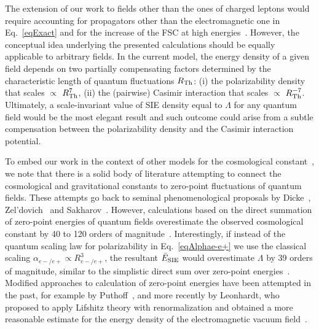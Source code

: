 \documentclass[aps,prl,twocolumn,showpacs,groupaddress]{revtex4-1}
\newcommand{\bbb}[1]{{\color{black}#1}}
\begin{document}
The extension of our work to fields other than the \bbb{ones of charged leptons} 
would require accounting for propagators other than the electromagnetic
one in Eq.~\eqref{eqExact} and for the increase of the FSC at high energies~\cite{Fritzsch2002}. However, the conceptual idea underlying the presented calculations should be equally applicable to arbitrary fields. In the current model, the energy density of a given field depends on two partially compensating factors determined by the characteristic length of quantum fluctuations $R_{\rm Th}$: (i) the polarizability density that scales $\propto$ $R_{\rm Th}^7$, (ii) the (pairwise) Casimir interaction that scales $\propto$ $R_{\rm Th}^{-7}$. Ultimately, a scale-invariant value of SIE density equal to $\Lambda$ for any quantum field would be the most elegant result and such outcome could arise from a subtle compensation between the polarizability density and the Casimir interaction potential. 

To embed our work in the context of other models for the cosmological constant~\cite{CC-RMP}, we note that there is a solid body of literature attempting to connect the cosmological and gravitational constants to zero-point fluctuations of quantum fields. These attempts go back to seminal phenomenological proposals by Dicke~\cite{Dicke}, Zel'dovich~\cite{Zeldovich} and Sakharov~\cite{Sakharov}. However, calculations based on the direct summation of zero-point energies of quantum fields overestimate the observed cosmological constant by 40 to 120 orders of magnitude~\cite{CC-RMP}. Interestingly, if instead of the quantum scaling law for polarizability in Eq.~\eqref{eqAlphae-e+} we use the classical scaling $\alpha_{e-/e+} \propto R_{e-/e+}^3$, the resultant $\bar{E}_{\rm SIE}$ would overestimate $\Lambda$ 
by 39 orders of magnitude, similar to the simplistic direct sum over zero-point energies~\cite{Hawking}. Modified approaches to calculation of zero-point energies have been attempted in the past, for example by Puthoff~\cite{Puthoff1,Puthoff2}, and more recently by Leonhardt, who proposed to apply Lifshitz theory with renormalization and obtained a more reasonable estimate for the energy density of the electromagnetic vacuum field~\cite{Leonhardt1,Leonhardt2}.
\end{document}
